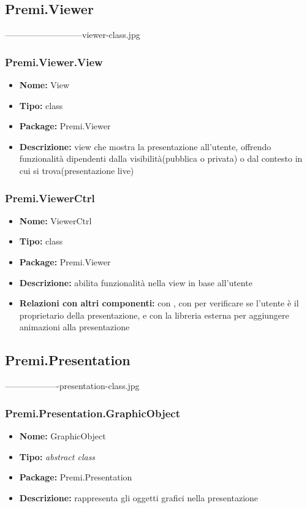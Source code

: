 \subsection{Premi.Viewer}
---------------------------viewer-class.jpg
\subsubsection{Premi.Viewer.View}
\begin{itemize}
  \item \textbf{Nome:} View
  \item \textbf{Tipo:} class
  \item \textbf{Package:} Premi.Viewer
  \item \textbf{Descrizione:} view che mostra la presentazione all'utente, offrendo funzionalità dipendenti dalla visibilità(pubblica o privata) o dal contesto in cui si trova(presentazione live) 
\end{itemize}
\subsubsection{Premi.ViewerCtrl}
\begin{itemize}
  \item \textbf{Nome:} ViewerCtrl
  \item \textbf{Tipo:} class
  \item \textbf{Package:} Premi.Viewer
  \item \textbf{Descrizione:} abilita funzionalità nella view in base all'utente
  \item \textbf{Relazioni con altri componenti:} con , con  per verificare se l'utente è il proprietario della presentazione, e con la libreria esterna  per aggiungere animazioni alla presentazione
\end{itemize}
\subsection{Premi.Presentation}
-------------------presentation-class.jpg
\subsubsection{Premi.Presentation.GraphicObject}
\begin{itemize}
  \item \textbf{Nome:} GraphicObject
  \item \textbf{Tipo:} \textit{abstract class}
  \item \textbf{Package:} Premi.Presentation
  \item \textbf{Descrizione:} rappresenta gli oggetti grafici nella presentazione
\end{itemize}
